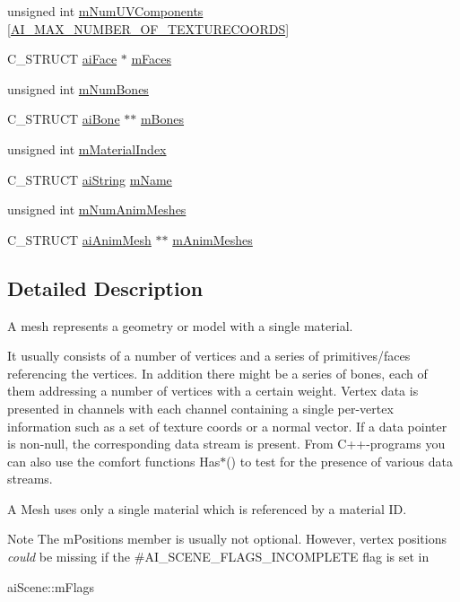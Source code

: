 \begin{DoxyCompactItemize}
\item 
unsigned int \hyperlink{structai_mesh_a635c631a6e66d32989d6b25b2a892d86}{m\-Num\-U\-V\-Components} \mbox{[}\hyperlink{ai_mesh_8h_a335874c5058c7f1e866eb953bf192258}{A\-I\-\_\-\-M\-A\-X\-\_\-\-N\-U\-M\-B\-E\-R\-\_\-\-O\-F\-\_\-\-T\-E\-X\-T\-U\-R\-E\-C\-O\-O\-R\-D\-S}\mbox{]}
\item 
C\-\_\-\-S\-T\-R\-U\-C\-T \hyperlink{structai_face}{ai\-Face} $\ast$ \hyperlink{structai_mesh_a5a65fbc7fdea7f8d36f39047425ece07}{m\-Faces}
\item 
unsigned int \hyperlink{structai_mesh_a0f9d5425b6300e32a842a94f943fd79e}{m\-Num\-Bones}
\item 
C\-\_\-\-S\-T\-R\-U\-C\-T \hyperlink{structai_bone}{ai\-Bone} $\ast$$\ast$ \hyperlink{structai_mesh_a0c0582a7f45b340b6a33552c53232539}{m\-Bones}
\item 
unsigned int \hyperlink{structai_mesh_aa2807c7ba172115203ed16047ad65f9e}{m\-Material\-Index}
\item 
C\-\_\-\-S\-T\-R\-U\-C\-T \hyperlink{structai_string}{ai\-String} \hyperlink{structai_mesh_a8dd9433e0c5b008e3e5aee6c801d3b74}{m\-Name}
\item 
unsigned int \hyperlink{structai_mesh_a1692a300222b32348ae51779df4a697e}{m\-Num\-Anim\-Meshes}
\item 
C\-\_\-\-S\-T\-R\-U\-C\-T \hyperlink{structai_anim_mesh}{ai\-Anim\-Mesh} $\ast$$\ast$ \hyperlink{structai_mesh_a5078f7db7e99ed05db89dfa412f0e990}{m\-Anim\-Meshes}
\end{DoxyCompactItemize}


\subsection{Detailed Description}
A mesh represents a geometry or model with a single material. 

It usually consists of a number of vertices and a series of primitives/faces referencing the vertices. In addition there might be a series of bones, each of them addressing a number of vertices with a certain weight. Vertex data is presented in channels with each channel containing a single per-\/vertex information such as a set of texture coords or a normal vector. If a data pointer is non-\/null, the corresponding data stream is present. From C++-\/programs you can also use the comfort functions Has$\ast$() to test for the presence of various data streams.

A Mesh uses only a single material which is referenced by a material I\-D. \begin{DoxyNote}{Note}
The m\-Positions member is usually not optional. However, vertex positions {\itshape could} be missing if the \#\-A\-I\-\_\-\-S\-C\-E\-N\-E\-\_\-\-F\-L\-A\-G\-S\-\_\-\-I\-N\-C\-O\-M\-P\-L\-E\-T\-E flag is set in 
\begin{DoxyCode}
aiScene::mFlags
\end{DoxyCode}
 
\end{DoxyNote}


